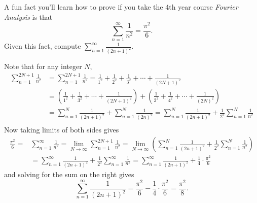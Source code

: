 \documentclass[11pt,dvipsnames]{book}
\numberwithin{figure}{section} %
\numberwithin{table}{section} %
\begin{document}
\begin{exercise}
 A fun fact you'll learn how to prove if you take the 4th year course {\it Fourier Analysis} is that
\[
\sum_{n=1}^{\infty}\frac{1}{n^2}=\frac{\pi^{2}}{6}.
\]
Given this fact, compute $\sum_{n=1}^{\infty}\frac{1}{(2n+1)^2}$.

\begin{solution}
Note that  for any integer $N$,
\begin{align*}
\sum_{n=1}^{2N+1}\frac{1}{n^{2}}
& =
\sum_{n=1}^{2N+1}\frac{1}{n^{2}}
=\frac{1}{1^{2}}+\frac{1}{2^{2}}+\frac{1}{3^{2}}+\cdots + \frac{1}{(2N+1)^2}\\
& =\left(\frac{1}{1^{2}}+\frac{1}{3^{2}}+\cdots + \frac{1}{(2N+1)^2}\right)
+\left(\frac{1}{2^{2}}+\frac{1}{4^{2}}+\cdots + \frac{1}{(2N)^2}\right)\\
& =\sum_{n=1}^{N}\frac{1}{(2n+1)^{2}}+ \sum_{n=1}^{N}\frac{1}{(2n)^{2}}
= \sum_{n=1}^{N}\frac{1}{(2n+1)^{2}}+\frac{1}{2^2} \sum_{n=1}^{N}\frac{1}{n^{2}}\\
\end{align*}
Now taking limits of both sides gives
\begin{align*}
\frac{\pi^{2}}{6} =
& \sum_{n=1}^{\infty}\frac{1}{n^2}
=\lim_{N\rightarrow\infty}\sum_{n=1}^{2N+1}\frac{1}{n^{2}}
 =\lim_{N\rightarrow\infty} \left(\sum_{n=1}^{N}\frac{1}{(2n+1)^{2}}+\frac{1}{2^2} \sum_{n=1}^{N}\frac{1}{n^{2}}\right) \\
& =\sum_{n=1}^{\infty}\frac{1}{(2n+1)^{2}}+ \frac{1}{2^2} \sum_{n=1}^{\infty}\frac{1}{n^{2}}
 = \sum_{n=1}^{\infty}\frac{1}{(2n+1)^{2}}+ \frac{1}{4} \cdot \frac{\pi^{2}}{6}
\end{align*}
and solving for the sum on the right gives
\[
\sum_{n=1}^{\infty}\frac{1}{(2n+1)^{2}}= \frac{\pi^{2}}{6} - \frac{1}{4} \cdot \frac{\pi^{2}}{6}=\frac{\pi^{2}}{8}.
\]

\end{solution}
\end{exercise}




\end{document}
